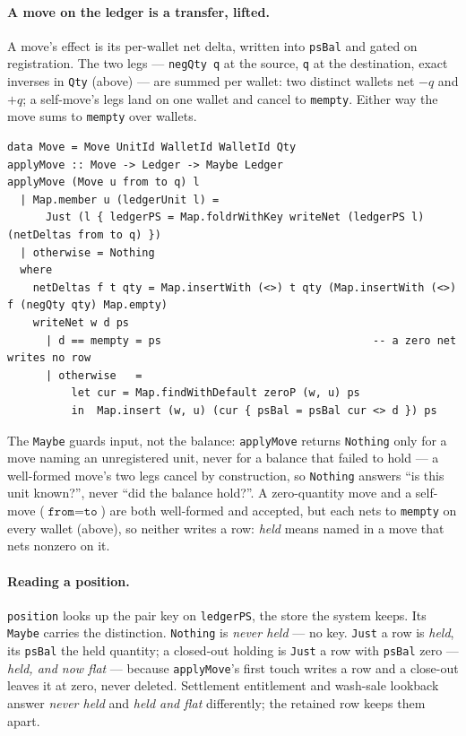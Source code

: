 \documentclass[11pt,a4paper]{article}
\begin{document}
\paragraph{A move on the ledger is a transfer, lifted.}
A move's effect is its per-wallet net delta, written into \texttt{psBal} and gated on
registration. The two legs --- \texttt{negQty q} at the source, \texttt{q} at the
destination, exact inverses in \texttt{Qty} (above) --- are summed per wallet: two
distinct wallets net $-q$ and $+q$; a self-move's legs land on one wallet and cancel to
\texttt{mempty}. Either way the move sums to \texttt{mempty} over wallets.

\begin{lstlisting}
data Move = Move UnitId WalletId WalletId Qty
applyMove :: Move -> Ledger -> Maybe Ledger
applyMove (Move u from to q) l
  | Map.member u (ledgerUnit l) =
      Just (l { ledgerPS = Map.foldrWithKey writeNet (ledgerPS l) (netDeltas from to q) })
  | otherwise = Nothing
  where
    netDeltas f t qty = Map.insertWith (<>) t qty (Map.insertWith (<>) f (negQty qty) Map.empty)
    writeNet w d ps
      | d == mempty = ps                                 -- a zero net writes no row
      | otherwise   =
          let cur = Map.findWithDefault zeroP (w, u) ps
          in  Map.insert (w, u) (cur { psBal = psBal cur <> d }) ps
\end{lstlisting}

The \texttt{Maybe} guards input, not the balance: \texttt{applyMove} returns
\texttt{Nothing} only for a move naming an unregistered unit, never for a balance
that failed to hold --- a well-formed move's two legs cancel by construction, so
\texttt{Nothing} answers ``is this unit known?'', never ``did the balance hold?''. A
zero-quantity move and a self-move ($\texttt{from} = \texttt{to}$) are both well-formed
and accepted, but each nets to \texttt{mempty} on every wallet (above), so neither
writes a row: \emph{held} means named in a move that nets nonzero on it.

\paragraph{Reading a position.}
\texttt{position} looks up the pair key on \texttt{ledgerPS}, the store the system
keeps. Its \texttt{Maybe} carries the distinction. \texttt{Nothing} is \emph{never
held} --- no key. \texttt{Just} a row is \emph{held}, its \texttt{psBal} the held
quantity; a closed-out holding is \texttt{Just} a row with \texttt{psBal} zero ---
\emph{held, and now flat} --- because \texttt{applyMove}'s first touch writes a row
and a close-out leaves it at zero, never deleted. Settlement entitlement and
wash-sale lookback answer \emph{never held} and \emph{held and flat} differently; the
retained row keeps them apart.
\end{document}
